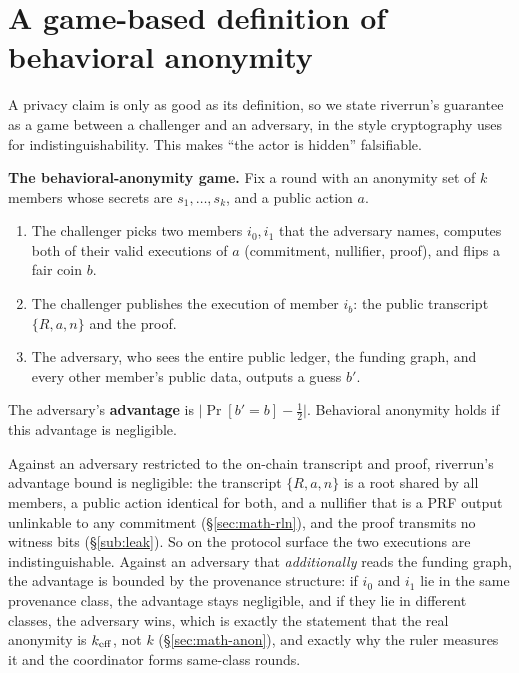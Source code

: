 \documentclass[11pt]{article}
\begin{document}
\section{A game-based definition of behavioral anonymity}
\label{sec:math-game}

A privacy claim is only as good as its definition, so we state riverrun's guarantee as a
game between a challenger and an adversary, in the style cryptography uses for
indistinguishability. This makes ``the actor is hidden'' falsifiable.

\textbf{The behavioral-anonymity game.} Fix a round with an anonymity set of $k$ members
whose secrets are $s_1, \dots, s_k$, and a public action $a$.
\begin{enumerate}[leftmargin=1.5em,itemsep=0.1em]
\item The challenger picks two members $i_0, i_1$ that the adversary names, computes both
      of their valid executions of $a$ (commitment, nullifier, proof), and flips a fair
      coin $b$.
\item The challenger publishes the execution of member $i_b$: the public transcript
      $\{R, a, n\}$ and the proof.
\item The adversary, who sees the entire public ledger, the funding graph, and every
      other member's public data, outputs a guess $b'$.
\end{enumerate}
The adversary's \textbf{advantage} is $\big|\Pr[b' = b] - \tfrac12\big|$. Behavioral
anonymity holds if this advantage is negligible.

\begin{claimx}
Against an adversary restricted to the on-chain transcript and proof, riverrun's advantage
bound is negligible: the transcript $\{R, a, n\}$ is a root shared by all members, a public
action identical for both, and a nullifier that is a PRF output unlinkable to any
commitment (\S\ref{sec:math-rln}), and the proof transmits no witness bits
(\S\ref{sub:leak}). So on the protocol surface the two executions are indistinguishable.
Against an adversary that \emph{additionally} reads the funding graph, the advantage is
bounded by the provenance structure: if $i_0$ and $i_1$ lie in the same provenance class,
the advantage stays negligible, and if they lie in different classes, the adversary wins,
which is exactly the statement that the real anonymity is $k_{\mathrm{eff}}$, not $k$
(\S\ref{sec:math-anon}), and exactly why the ruler measures it and the coordinator forms
same-class rounds.
\end{claimx}
\end{document}
